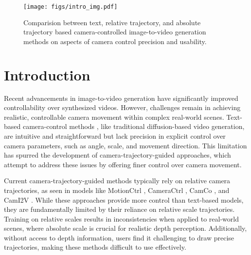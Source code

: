 \begin{figure*}[t]
    \centering
    \texttt{[image: figs/intro\_img.pdf]}
    \vspace{-3mm}
    \caption{
    Comparision between text, relative trajectory, and absolute trajectory based camera-controlled image-to-video generation methods on aspects of camera control precision and usability.
    }
    \label{fig:intro}
    \vspace{-2mm}
\end{figure*}
\vspace{-2mm}
\section{Introduction}
\label{Introduction}
Recent advancements in image-to-video generation \cite{Guo2023, he2022latent, chen2023videocrafter1, chen2024videocrafter2, brooks2024video, yang2024cogvideox} have significantly improved controllability over synthesized videos.
However, challenges remain in achieving realistic, controllable camera movement within complex real-world scenes.
Text-based camera-control methods \cite{Guo2023, Blattmann2023, li2024image, hu2024motionmaster, jain2024peekaboo, wang2024videocomposer}, like traditional diffusion-based video generation, are intuitive and straightforward but lack precision in explicit control over camera parameters, such as angle, scale, and movement direction.
This limitation has spurred the development of camera-trajectory-guided approaches, which attempt to address these issues by offering finer control over camera movement.



Current camera-trajectory-guided methods typically rely on relative camera trajectories, as seen in models like MotionCtrl  \cite{Wang2024Motionctrl}, CameraCtrl \cite{He2024Cameractrl}, CamCo \cite{xu2024camco}, and CamI2V \cite{zheng2024cami2v}. While these approaches provide more control than text-based models, they are fundamentally limited by their reliance on relative scale trajectories. Training on relative scales results in inconsistencies when applied to real-world scenes, where absolute scale is crucial for realistic depth perception. Additionally, without access to depth information, users find it challenging to draw precise trajectories, making these methods difficult to use effectively.

